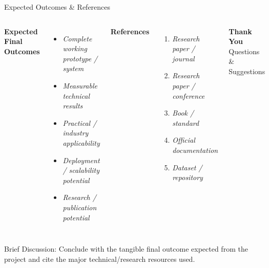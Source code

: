 \documentclass[aspectratio=169,11pt]{beamer}
\newcommand{\smallnote}[1]{%
\vspace{0.08cm}
{\scriptsize\color{GEUGrey}#1}
}
\newcommand{\placeholder}[1]{%
\textit{\color{GEUGrey}#1}
}
\begin{document}
\begin{frame}{Expected Outcomes \& References}

\begin{columns}[T,totalwidth=\textwidth]


\textbf{\color{GEUBlue}Expected Final Outcomes}

\begin{itemize}\itemsep3pt
\item \placeholder{Complete working prototype / system}
\item \placeholder{Measurable technical results}
\item \placeholder{Practical / industry applicability}
\item \placeholder{Deployment / scalability potential}
\item \placeholder{Research / publication potential}
\end{itemize}


\textbf{\color{GEUBlue}References}

\begin{enumerate}\itemsep3pt
\item \placeholder{Research paper / journal}
\item \placeholder{Research paper / conference}
\item \placeholder{Book / standard}
\item \placeholder{Official documentation}
\item \placeholder{Dataset / repository}
\end{enumerate}

\vfill

\begin{center}

\colorbox{GEUBlue}{
\parbox{.78\textwidth}{
\centering
\color{white}
\textbf{Thank You}\\
Questions \& Suggestions
}}

\end{center}

\end{columns}

\vfill

\smallnote{
Brief Discussion: Conclude with the tangible final outcome expected
from the project and cite the major technical/research resources used.
}

\end{frame}
\end{document}
